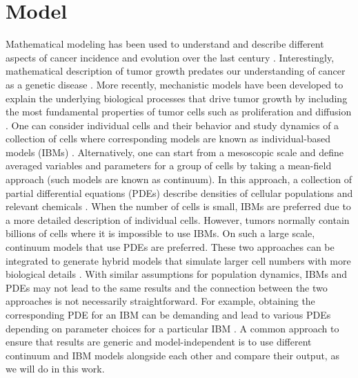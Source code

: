 \documentclass[aps,prl, superscriptaddress,groupedaddress]{revtex4}  %
\begin{document}
	\section{Model}
	 Mathematical modeling has been used to understand and describe different aspects of cancer incidence and evolution over the last century \cite{byrne2010dissecting, altrock2015mathematics}. Interestingly, mathematical description of tumor growth predates our understanding of cancer as a genetic disease \cite{mayneord1932law, schrek1935quantitative}. More recently, mechanistic models have been developed to explain the underlying biological processes that drive tumor growth by including the most fundamental properties of tumor cells such as proliferation and diffusion \cite{anderson2008integrative}. One can consider individual cells and their behavior and study dynamics of a collection of cells where corresponding models are known as individual-based models (IBMs) \cite{metzcar2019review, azimzade2019short}. Alternatively, one can start from a mesoscopic scale and define averaged variables and parameters for a group of cells by taking a mean-field approach (such models are known as continuum).  In this approach, a collection of partial differential equations (PDEs) describe densities of cellular populations and relevant chemicals \cite{swanson2003virtual, mandonnet2003continuous, azimzade2019effect}.  When the number of cells is small, IBMs are preferred due to a more detailed description of individual cells. However, tumors normally contain billions of cells where it is impossible to use IBMs. On such a large scale, continuum models that use PDEs are preferred.  These two approaches can be integrated to generate hybrid models that simulate larger cell numbers with more biological details \cite{rejniak2011hybrid, jimenez2021mesoscopic}. With similar assumptions for population dynamics, IBMs and PDEs may not lead to the same results \cite{azimzade2020invasion} and the connection between the two approaches is not necessarily straightforward. For example, obtaining the corresponding PDE for an IBM can be demanding and lead to various PDEs depending on parameter choices for a particular IBM \cite{johnston2017co}. A common approach to ensure that results are generic and model-independent is to use different continuum and IBM models alongside each other and compare their output, as we will do in this work.  
	
\end{document}
